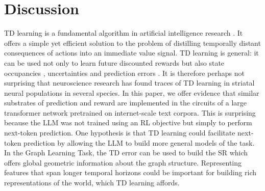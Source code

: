 \documentclass{article} %
\begin{document}
\section{Discussion}

TD learning is a fundamental algorithm in artificial intelligence research \citep{sutton1987temporal,sutton_reinforcement_2018, mnih2015human}. It offers a simple yet efficient solution to the problem of distilling temporally distant consequences of actions into an immediate value signal. TD learning is general: it can be used not only to learn future discounted rewards but also state occupancies \citep{dayan_improving_1993}, uncertainties \citep{guez2012efficient} and prediction errors \citep{burda2018exploration, saanum2024reinforcement}. It is therefore perhaps not surprising that neuroscience research has found traces of TD learning in striatal neural populations in several species. In this paper, we offer evidence that similar substrates of prediction and reward are implemented in the circuits of a large transformer network pretrained on internet-scale text corpora. This is surprising because the LLM was not trained using an RL objective but simply to perform next-token prediction. One hypothesis is that TD learning could facilitate next-token prediction by allowing the LLM to build more general models of the task. In the Graph Learning Task, the TD error can be used to build the SR which offers global geometric information about the graph structure. Representing features that span longer temporal horizons could be important for building rich representations of the world, which TD learning affords.




\end{document}
